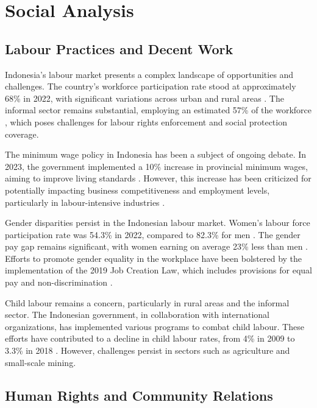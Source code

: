 \section{Social Analysis}

\subsection{Labour Practices and Decent Work}

Indonesia's labour market presents a complex landscape of opportunities and challenges. The country's workforce participation rate stood at approximately 68\% in 2022, with significant variations across urban and rural areas \cite{WorldBank2023}. The informal sector remains substantial, employing an estimated 57\% of the workforce \cite{ILO2022}, which poses challenges for labour rights enforcement and social protection coverage.

The minimum wage policy in Indonesia has been a subject of ongoing debate. In 2023, the government implemented a 10\% increase in provincial minimum wages, aiming to improve living standards \cite{BPS2023}. However, this increase has been criticized for potentially impacting business competitiveness and employment levels, particularly in labour-intensive industries \cite{WorldBank2023}.

Gender disparities persist in the Indonesian labour market. Women's labour force participation rate was 54.3\% in 2022, compared to 82.3\% for men \cite{BPS2023}. The gender pay gap remains significant, with women earning on average 23\% less than men \cite{WorldBank2022}. Efforts to promote gender equality in the workplace have been bolstered by the implementation of the 2019 Job Creation Law, which includes provisions for equal pay and non-discrimination \cite{LawNo11of2020}.

Child labour remains a concern, particularly in rural areas and the informal sector. The Indonesian government, in collaboration with international organizations, has implemented various programs to combat child labour. These efforts have contributed to a decline in child labour rates, from 4\% in 2009 to 3.3\% in 2018 \cite{ILO2020}. However, challenges persist in sectors such as agriculture and small-scale mining.

\subsection{Human Rights and Community Relations}

